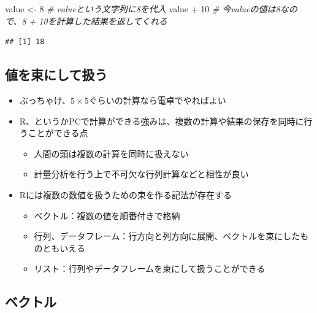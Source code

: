 \documentclass[
]{ltjsarticle}
\newenvironment{Shaded}{\begin{snugshade}}{\end{snugshade}}
\newcommand{\CommentTok}[1]{\textcolor[rgb]{0.56,0.35,0.01}{\textit{#1}}}
\newcommand{\DecValTok}[1]{\textcolor[rgb]{0.00,0.00,0.81}{#1}}
\newcommand{\NormalTok}[1]{#1}
\newcommand{\OtherTok}[1]{\textcolor[rgb]{0.56,0.35,0.01}{#1}}
\newcommand{\SpecialCharTok}[1]{\textcolor[rgb]{0.00,0.00,0.00}{#1}}
\providecommand{\tightlist}{%
  \setlength{\itemsep}{0pt}\setlength{\parskip}{0pt}}
\begin{document}
\begin{Shaded}
\begin{Highlighting}[]
\NormalTok{value }\OtherTok{\textless{}{-}} \DecValTok{8} \CommentTok{\# valueという文字列に8を代入}
\NormalTok{value }\SpecialCharTok{+} \DecValTok{10} \CommentTok{\# 今valueの値は8なので、8 + 10を計算した結果を返してくれる}
\end{Highlighting}
\end{Shaded}

\begin{verbatim}
## [1] 18
\end{verbatim}

\hypertarget{ux5024ux3092ux675fux306bux3057ux3066ux6271ux3046}{%
\subsection{値を束にして扱う}\label{ux5024ux3092ux675fux306bux3057ux3066ux6271ux3046}}

\begin{itemize}
\tightlist
\item
  ぶっちゃけ、\(5 \times 5\)ぐらいの計算なら電卓でやればよい
\item
  R、というかPCで計算ができる強みは、複数の計算や結果の保存を同時に行うことができる点

  \begin{itemize}
  \tightlist
  \item
    人間の頭は複数の計算を同時に扱えない
  \item
    計量分析を行う上で不可欠な行列計算などと相性が良い
  \end{itemize}
\item
  Rには複数の数値を扱うための束を作る記法が存在する

  \begin{itemize}
  \tightlist
  \item
    ベクトル：複数の値を順番付きで格納
  \item
    行列、データフレーム：行方向と列方向に展開、ベクトルを束にしたものともいえる
  \item
    リスト：行列やデータフレームを束にして扱うことができる
  \end{itemize}
\end{itemize}

\hypertarget{ux30d9ux30afux30c8ux30eb}{%
\subsection{ベクトル}\label{ux30d9ux30afux30c8ux30eb}}
\end{document}
